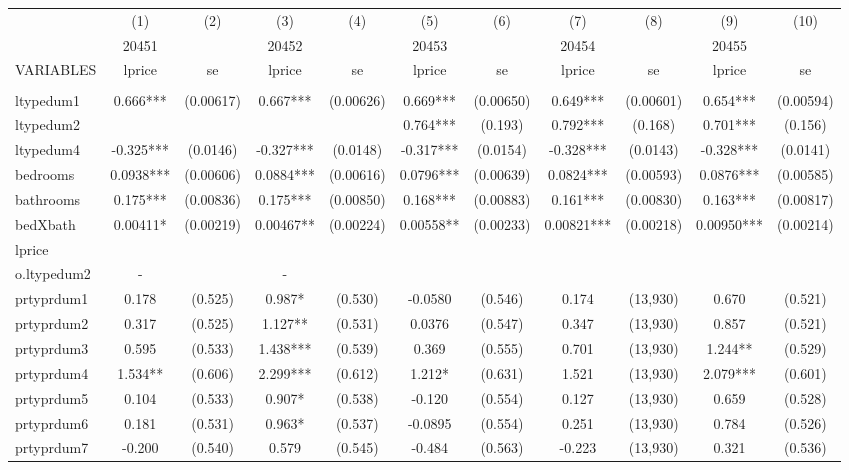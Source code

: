 \documentclass[]{article}
\begin{document}
\begin{tabular}{lcccccccccc} \hline
 & (1) & (2) & (3) & (4) & (5) & (6) & (7) & (8) & (9) & (10) \\
 & 20451 &  & 20452 &  & 20453 &  & 20454 &  & 20455 &  \\
VARIABLES & lprice & se & lprice & se & lprice & se & lprice & se & lprice & se \\ \hline
 &  &  &  &  &  &  &  &  &  &  \\
ltypedum1 & 0.666*** & (0.00617) & 0.667*** & (0.00626) & 0.669*** & (0.00650) & 0.649*** & (0.00601) & 0.654*** & (0.00594) \\
ltypedum2 &  &  &  &  & 0.764*** & (0.193) & 0.792*** & (0.168) & 0.701*** & (0.156) \\
ltypedum4 & -0.325*** & (0.0146) & -0.327*** & (0.0148) & -0.317*** & (0.0154) & -0.328*** & (0.0143) & -0.328*** & (0.0141) \\
bedrooms & 0.0938*** & (0.00606) & 0.0884*** & (0.00616) & 0.0796*** & (0.00639) & 0.0824*** & (0.00593) & 0.0876*** & (0.00585) \\
bathrooms & 0.175*** & (0.00836) & 0.175*** & (0.00850) & 0.168*** & (0.00883) & 0.161*** & (0.00830) & 0.163*** & (0.00817) \\
bedXbath & 0.00411* & (0.00219) & 0.00467** & (0.00224) & 0.00558** & (0.00233) & 0.00821*** & (0.00218) & 0.00950*** & (0.00214) \\
lprice &  &  &  &  &  &  &  &  &  &  \\
o.ltypedum2 & - &  & - &  &  &  &  &  &  &  \\
prtyprdum1 & 0.178 & (0.525) & 0.987* & (0.530) & -0.0580 & (0.546) & 0.174 & (13,930) & 0.670 & (0.521) \\
prtyprdum2 & 0.317 & (0.525) & 1.127** & (0.531) & 0.0376 & (0.547) & 0.347 & (13,930) & 0.857 & (0.521) \\
prtyprdum3 & 0.595 & (0.533) & 1.438*** & (0.539) & 0.369 & (0.555) & 0.701 & (13,930) & 1.244** & (0.529) \\
prtyprdum4 & 1.534** & (0.606) & 2.299*** & (0.612) & 1.212* & (0.631) & 1.521 & (13,930) & 2.079*** & (0.601) \\
prtyprdum5 & 0.104 & (0.533) & 0.907* & (0.538) & -0.120 & (0.554) & 0.127 & (13,930) & 0.659 & (0.528) \\
prtyprdum6 & 0.181 & (0.531) & 0.963* & (0.537) & -0.0895 & (0.554) & 0.251 & (13,930) & 0.784 & (0.526) \\
prtyprdum7 & -0.200 & (0.540) & 0.579 & (0.545) & -0.484 & (0.563) & -0.223 & (13,930) & 0.321 & (0.536) \\

\end{tabular}
\end{document}
